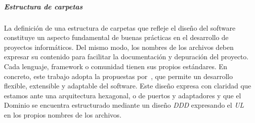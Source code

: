 \subparagraph{Estructura de carpetas}

La definición de una estructura de carpetas que refleje el diseño del software constituye un aspecto fundamental de buenas prácticas en el desarrollo de proyectos informáticos.
Del mismo modo, los nombres de los archivos deben expresar su contenido para facilitar la documentación y depuración del proyecto.
Cada lenguaje, framework o comunidad tienen sus propios estándares.
En concreto, este trabajo adopta la propuestas por~\cite{TomHombergs2019GYHD}, que permite un desarrollo flexible, extensible y adaptable del software.
Este diseño expresa con claridad que estamos ante una arquitectura hexagonal, o de puertos y adaptadores y que el Dominio se encuentra estructurado mediante un diseño \textit{DDD} expresando el \textit{UL} en los propios nombres de los archivos.



